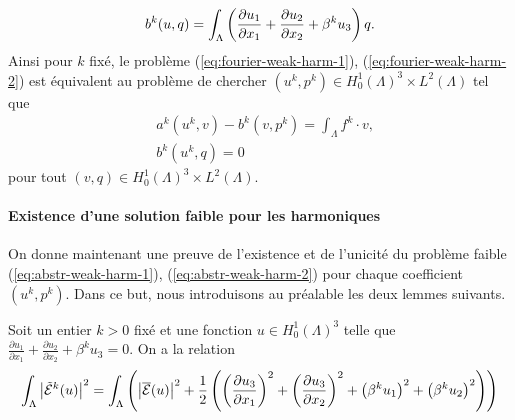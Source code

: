 \begin{equation}
  b^k(u, q) = \int_\Lambda \left( \frac{\partial u_1}{\partial x_1} +
    \frac{\partial u_2}{\partial x_2} + \beta^k u_3 \right)q.
\end{equation}
Ainsi pour $k$ fixé, le problème (\ref{eq:fourier-weak-harm-1}),
(\ref{eq:fourier-weak-harm-2}) est équivalent au problème de
chercher $(u^k,p^k)\in H^1_0(\Lambda)^3 \times L^2(\Lambda)$ tel que
\begin{align}
  &a^k(u^k,v) - b^k(v,p^k) = \int_\Lambda f^k\cdot v,\label{eq:abstr-weak-harm-1}\\
  & b^k(u^k, q) = 0\label{eq:abstr-weak-harm-2}
\end{align}
pour tout $(v, q)\in H^1_0(\Lambda)^3 \times L^2(\Lambda)$.

\paragraph{Existence d'une solution faible pour les harmoniques}
On donne maintenant une preuve de l'existence et de l'unicité du
problème faible (\ref{eq:abstr-weak-harm-1}),
(\ref{eq:abstr-weak-harm-2}) pour chaque coefficient $(u^k,p^k)$. Dans ce
but, nous introduisons au préalable les deux lemmes suivants.

\begin{lemme}\label{lem:1}
Soit un entier $k > 0$ fixé et une fonction $u \in H^1_0(\Lambda)^3$
telle que $\frac{\partial u_1}{\partial x_1} + \frac{\partial
  u_2}{\partial x_2} + \beta^k u_3 = 0$. On a la relation
\begin{equation}
\int_\Lambda \left\lvert \tilde{\mathcal E}^k(u) \right\rvert^2 = \int_\Lambda
\left( \left\lvert \overline{\mathcal E}(u) \right\rvert^2 +
  \frac{1}{2}\left( \left( \frac{\partial u_3}{\partial x_1} \right)^2 +
    \left( \frac{\partial u_3}{\partial x_2} \right)^2 +
    \left( \beta^k u_1 \right)^2  + \left( \beta^k u_2 \right)^2 \right) \right)
\end{equation}
\end{lemme}

